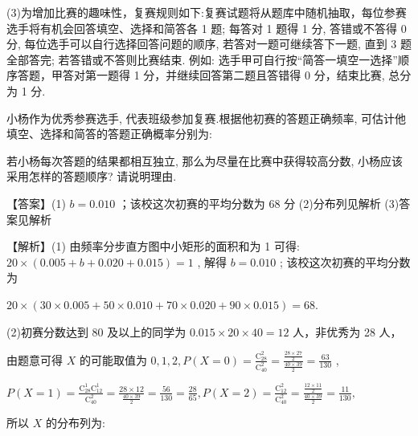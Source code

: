 \documentclass[10pt]{article}
\begin{document}
(3)为增加比赛的趣味性，复赛规则如下:复赛试题将从题库中随机抽取，每位参赛选手将有机会回答填空、选择和简答各 1 题; 每答对 1 题得 1 分, 答错或不答得 0 分, 每位选手可以自行选择回答问题的顺序, 若答对一题可继续答下一题, 直到 3 题全部答完; 若答错或不答则比赛结束. 例如: 选手甲可自行按“简答一填空一选择”顺序答题，甲答对第一题得 1 分，并继续回答第二题且答错得 0 分，结束比赛, 总分为 1 分.

小杨作为优秀参赛选手, 代表班级参加复赛.根据他初赛的答题正确频率, 可估计他填空、选择和简答的答题正确概率分别为:

\begin{center}
\end{center}

若小杨每次答题的结果都相互独立, 那么为尽量在比赛中获得较高分数, 小杨应该采用怎样的答题顺序? 请说明理由.

【答案】(1) \(b = {0.010}\) ；该校这次初赛的平均分数为 68 分 (2)分布列见解析 (3)答案见解析

【解析】(1) 由频率分步直方图中小矩形的面积和为 1 可得: \({20} \times  \left( {{0.005} + b + {0.020} + {0.015}}\right)  = 1\) , 解得 \(b = {0.010}\) ; 该校这次初赛的平均分数为

\({20} \times  \left( {{30} \times  {0.005} + {50} \times  {0.010} + {70} \times  {0.020} + {90} \times  {0.015}}\right)  = {68}.\)

(2)初赛分数达到 80 及以上的同学为 \({0.015} \times  {20} \times  {40} = {12}\) 人，非优秀为 28 人，

由题意可得 \(X\) 的可能取值为 \(0,1,2,P\left( {X = 0}\right)  = \frac{{\mathrm{C}}_{28}^{2}}{{\mathrm{C}}_{40}^{2}} = \frac{\frac{{28} \times  {27}}{2}}{\frac{{40} \times  {39}}{2}} = \frac{63}{130}\) ,

\(P\left( {X = 1}\right)  = \frac{{\mathrm{C}}_{28}^{1}{\mathrm{C}}_{12}^{1}}{{\mathrm{C}}_{40}^{2}} = \frac{{28} \times  {12}}{\frac{{40} \times  {39}}{2}} = \frac{56}{130} = \frac{28}{65},P\left( {X = 2}\right)  = \frac{{\mathrm{C}}_{12}^{2}}{{\mathrm{C}}_{40}^{2}} = \frac{\frac{{12} \times  {11}}{2}}{\frac{{40} \times  {39}}{2}} = \frac{11}{130},\)

所以 \(X\) 的分布列为:

\begin{center}
\end{center}
\end{document}
